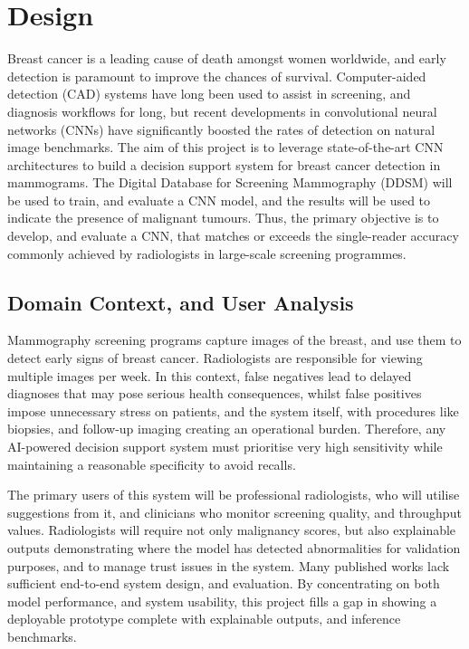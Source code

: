 \documentclass[../main]{subfiles}
\begin{document}
\chapter{Design}
Breast cancer is a leading cause of death amongst women worldwide, and early detection is paramount to improve the chances of survival. Computer-aided detection (CAD) systems have long been used to assist in screening, and diagnosis workflows for long, but recent developments in convolutional neural networks (CNNs) have significantly boosted the rates of detection on natural image benchmarks. The aim of this project is to leverage state-of-the-art CNN architectures to build a decision support system for breast cancer detection in mammograms. The Digital Database for Screening Mammography (DDSM) will be used to train, and evaluate a CNN model, and the results will be used to indicate the presence of malignant tumours. Thus, the primary objective is to develop, and evaluate a CNN, that matches or exceeds the single-reader accuracy commonly achieved by radiologists in large-scale screening programmes.

\section{Domain Context, and User Analysis}
Mammography screening programs capture images of the breast, and use them to detect early signs of breast cancer. Radiologists are responsible for viewing multiple images per week. In this context, false negatives lead to delayed diagnoses that may pose serious health consequences, whilst false positives impose unnecessary stress on patients, and the system itself, with procedures like biopsies, and follow-up imaging creating an operational burden. Therefore, any AI-powered decision support system must prioritise very high sensitivity while maintaining a reasonable specificity to avoid recalls.

The primary users of this system will be professional radiologists, who will utilise suggestions from it, and clinicians who monitor screening quality, and throughput values. Radiologists will require not only malignancy scores, but also explainable outputs demonstrating where the model has detected abnormalities for validation purposes, and to manage trust issues in the system. Many published works lack sufficient end-to-end system design, and evaluation. By concentrating on both model performance, and system usability, this project fills a gap in showing a deployable prototype complete with explainable outputs, and inference benchmarks.
\end{document}
